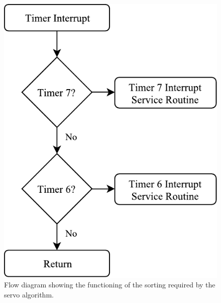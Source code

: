 \begin{figure}[H]
\centering
\includegraphics[scale = 1]{pics/Soft5.pdf}
\caption{Flow diagram showing the functioning of the sorting required by the servo algorithm.}
\label{fig:Soft5}
\end{figure}

